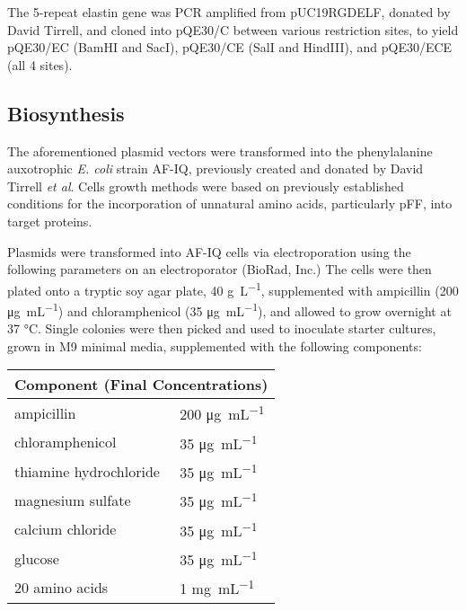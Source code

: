 \begin{refsection}
The 5-repeat elastin gene was PCR amplified from pUC19RGDELF, donated by David
Tirrell, and cloned into pQE30/C between various restriction sites, to yield
pQE30/EC (BamHI and SacI), pQE30/CE (SalI and HindIII), and pQE30/ECE (all 4
sites).

\subsection{Biosynthesis}

The aforementioned plasmid vectors were transformed into the phenylalanine
auxotrophic \emph{E. coli} strain AF-IQ, previously created and donated by David
Tirrell \emph{et al}.\cite{Yoshikawa1994,} Cells growth methods were based on
previously established conditions for the incorporation of unnatural amino
acids, particularly pFF, into target
proteins.\cite{Voloshchuk2009,Yoshikawa1994}

Plasmids were transformed into AF-IQ cells via electroporation using the
following parameters on an electroporator (BioRad, Inc.) The cells were then
plated onto a tryptic soy agar plate, 40
\si[inter-unit-product=\ensuremath{{}\cdot{}}]{\g\per\L},
supplemented with ampicillin (200 
\si[inter-unit-product=\ensuremath{{}\cdot{}}]{\ug\per\mL})
and chloramphenicol (35
\si[inter-unit-product=\ensuremath{{}\cdot{}}]{\ug\per\mL}), and
allowed to grow overnight at 37 \si{\celsius}. Single colonies were then picked
and used to inoculate starter cultures, grown in M9 minimal media, supplemented
with the following components:

\begin{table}[h!]
    \centering
\begin{tabular}{ |l|l| }
  \hline
  \multicolumn{2}{|c|}{Component (Final Concentrations)} \\
  \hline

  ampicillin & 200 
\si[inter-unit-product=\ensuremath{{}\cdot{}}]{\ug\per\mL} \\
  chloramphenicol & 35 
\si[inter-unit-product=\ensuremath{{}\cdot{}}]{\ug\per\mL} \\
  thiamine hydrochloride & 35 
\si[inter-unit-product=\ensuremath{{}\cdot{}}]{\ug\per\mL} \\
  magnesium sulfate & 35 
\si[inter-unit-product=\ensuremath{{}\cdot{}}]{\ug\per\mL} \\
  calcium chloride & 35 
\si[inter-unit-product=\ensuremath{{}\cdot{}}]{\ug\per\mL} \\
  glucose & 35 
\si[inter-unit-product=\ensuremath{{}\cdot{}}]{\ug\per\mL} \\
  20 amino acids & 1
\si[inter-unit-product=\ensuremath{{}\cdot{}}]{\mg\per\mL} \\


\end{tabular}
\end{table}
\end{refsection}
